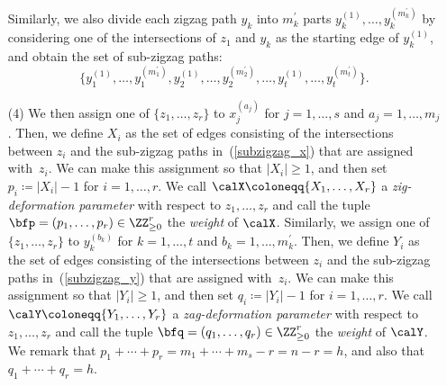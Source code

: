 \begin{setting}
\begin{itemize}
Similarly, we also divide each zigzag path $y_k$ into $m^\prime_k$ parts $y_k^{(1)},\dots,y_k^{(m^\prime_k)}$
by considering one of the intersections of $z_1$ and $y_k$ as the starting edge of $y_k^{(1)}$, and obtain the set of sub-zigzag paths:
\begin{equation}\label{subzigzag_y}
\big\{y_1^{(1)},\dots,y_1^{(m^\prime_1)}, y_2^{(1)},\dots,y_2^{(m^\prime_2)}, \dots, y_t^{(1)},\dots,y_t^{(m^\prime_t)}\big\}.
\end{equation}
\item[(4)]
We then assign one of $\{z_1, \dots, z_r\}$ to $x_j^{(a_j)}$ for $j=1, \dots, s$ and $a_j=1, \dots, m_j$.
Then, we define $X_i$ as the set of edges consisting of the intersections between $z_i$ and the sub-zigzag paths in~(\ref{subzigzag_x}) that are assigned with~$z_i$.
We can make this assignment so that $|X_i|\ge1$, and then set $p_i\coloneqq|X_i|-1$ for $i=1,\dots,r$.
We call $\calX\coloneqq\{X_1,\dots,X_r\}$ a \emph{zig-deformation parameter} with respect to $z_1,\dots,z_r$ and call the tuple $\bfp=(p_1,\dots,p_r)\in\ZZ^r_{\ge0}$ the \emph{weight} of $\calX$.
Similarly, we assign one of $\{z_1, \dots, z_r\}$ to $y_k^{(b_k)}$ for $k=1, \dots, t$ and $b_k=1, \dots, m^\prime_k$.
Then, we define $Y_i$ as the set of edges consisting of the intersections between $z_i$ and the sub-zigzag paths in~(\ref{subzigzag_y}) that are assigned with~$z_i$.
We can make this assignment so that $|Y_i|\ge1$, and then set $q_i\coloneqq|Y_i|-1$ for $i=1,\dots,r$.
We call $\calY\coloneqq\{Y_1,\dots,Y_r\}$ a \emph{zag-deformation parameter} with respect to $z_1,\dots,z_r$ and call the tuple $\bfq=(q_1,\dots,q_r)\in\ZZ^r_{\ge0}$ the \emph{weight} of $\calY$.
We remark that $p_1+\cdots+p_r=m_1+\cdots+m_s-r=n-r=h$, and also that $q_1+\cdots+q_r=h$.
\end{itemize}
\end{setting}

